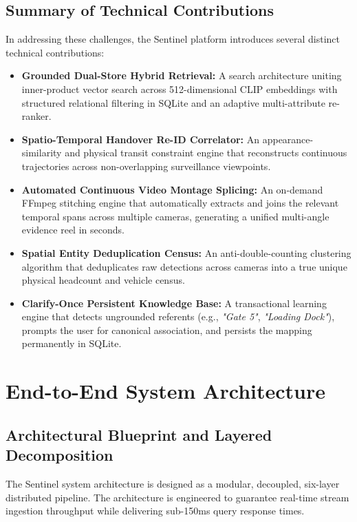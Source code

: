 \documentclass[12pt,a4paper]{article}
\begin{document}
\subsection{Summary of Technical Contributions}
In addressing these challenges, the Sentinel platform introduces several distinct technical contributions:
\begin{itemize}
    \item \textbf{Grounded Dual-Store Hybrid Retrieval:} A search architecture uniting inner-product vector search across 512-dimensional CLIP embeddings with structured relational filtering in SQLite and an adaptive multi-attribute re-ranker.
    \item \textbf{Spatio-Temporal Handover Re-ID Correlator:} An appearance-similarity and physical transit constraint engine that reconstructs continuous trajectories across non-overlapping surveillance viewpoints.
    \item \textbf{Automated Continuous Video Montage Splicing:} An on-demand FFmpeg stitching engine that automatically extracts and joins the relevant temporal spans across multiple cameras, generating a unified multi-angle evidence reel in seconds.
    \item \textbf{Spatial Entity Deduplication Census:} An anti-double-counting clustering algorithm that deduplicates raw detections across cameras into a true unique physical headcount and vehicle census.
    \item \textbf{Clarify-Once Persistent Knowledge Base:} A transactional learning engine that detects ungrounded referents (e.g., \textit{"Gate 5"}, \textit{"Loading Dock"}), prompts the user for canonical association, and persists the mapping permanently in SQLite.
\end{itemize}

\section{End-to-End System Architecture}

\subsection{Architectural Blueprint and Layered Decomposition}
The Sentinel system architecture is designed as a modular, decoupled, six-layer distributed pipeline. The architecture is engineered to guarantee real-time stream ingestion throughput while delivering sub-150ms query response times.
\end{document}

